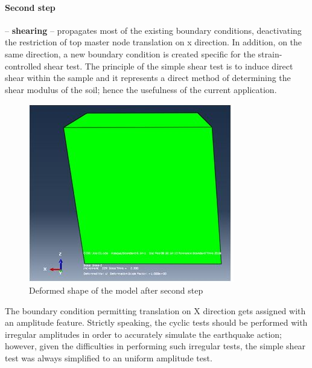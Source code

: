 \documentclass[11pt,a4paper]{report}
\begin{document}
\paragraph{Second step}
 – \textbf{shearing} – propagates most of the existing boundary conditions, deactivating the restriction of top master node translation on x direction. In addition, on the same direction, a new boundary condition is created specific for the strain-controlled shear test. The principle of the simple shear test is to induce direct shear within the sample and it represents a direct method of determining the shear modulus of the soil; hence the usefulness of the current application.

\begin{figure}[h!]
	\centering
	\includegraphics[width=0.33\linewidth]{"deformed"}
	\caption{Deformed shape of the model after second step}
	\label{deformed}
\end{figure}

The boundary condition permitting translation on X direction gets assigned with an amplitude feature. Strictly speaking, the cyclic tests should be performed with irregular amplitudes in order to accurately simulate the earthquake action; however, given the difficulties in performing such irregular tests, the simple shear test was always simplified to an uniform amplitude test. 
\end{document}
